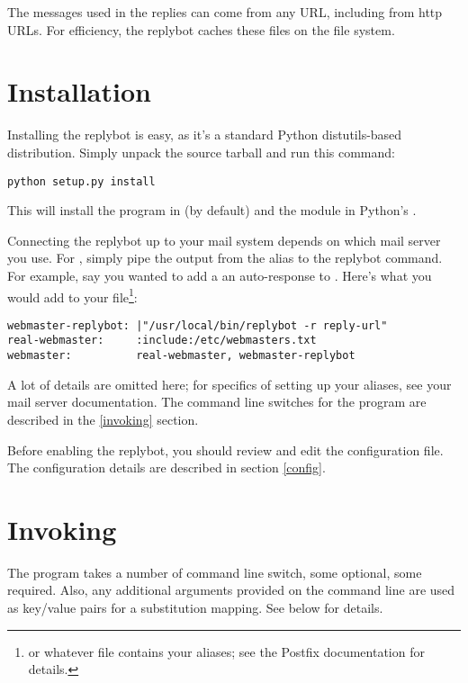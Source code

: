 \documentclass{howto}
\begin{document}
The messages used in the replies can come from any URL, including from http
URLs.  For efficiency, the replybot caches these files on the file system.

\section{Installation}

Installing the replybot is easy, as it's a standard Python distutils-based
distribution.  Simply unpack the source tarball and run this command:

\begin{verbatim}
python setup.py install
\end{verbatim}

This will install the  program in  (by
default) and the  module in Python's .

Connecting the replybot up to your mail system depends on which mail server
you use.  For , simply pipe the output
from the alias to the replybot command.  For example, say you wanted to add a
an auto-response to .  Here's what you would add
to your  file\footnote{or whatever file contains your
aliases; see the Postfix documentation for details.}:

\begin{verbatim}
webmaster-replybot: |"/usr/local/bin/replybot -r reply-url"
real-webmaster:     :include:/etc/webmasters.txt
webmaster:          real-webmaster, webmaster-replybot
\end{verbatim}

A lot of details are omitted here; for specifics of setting up your aliases,
see your mail server documentation.  The command line switches for the
 program are described in the \ref{invoking} section.

Before enabling the replybot, you should review and edit the configuration
file.  The configuration details are described in section \ref{config}.

\section{Invoking \label{invoking}}

The  program takes a number of command line switch, some
optional, some required.  Also, any additional arguments provided on the
command line are used as key/value pairs for a substitution mapping.  See
below for details.
\end{document}
